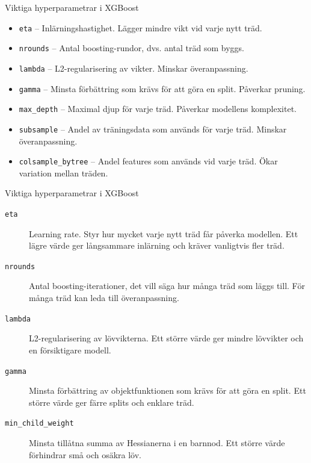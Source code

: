 \documentclass[10pt,english]{beamer}
\begin{document}
\begin{frame}{Viktiga hyperparametrar i XGBoost}
  \begin{itemize}
    \item \texttt{eta} – Inlärningshastighet. Lägger mindre vikt vid varje nytt träd.
    \item \texttt{nrounds} – Antal boosting-rundor, dvs. antal träd som byggs.
    \item \texttt{lambda} – L2-regularisering av vikter. Minskar överanpassning.
    \item \texttt{gamma} – Minsta förbättring som krävs för att göra en split. Påverkar pruning.
    \item \texttt{max\_depth} – Maximal djup för varje träd. Påverkar modellens komplexitet.
    \item \texttt{subsample} – Andel av träningsdata som används för varje träd. Minskar överanpassning.
    \item \texttt{colsample\_bytree} – Andel features som används vid varje träd. Ökar variation mellan träden.
    
    
  \end{itemize}
\end{frame}

\begin{frame}{Viktiga hyperparametrar i XGBoost}

\begin{description}

  \item[\texttt{eta}]
  Learning rate. Styr hur mycket varje nytt träd får påverka modellen.
  Ett lägre värde ger långsammare inlärning och kräver vanligtvis fler träd.

  \item[\texttt{nrounds}]
  Antal boosting-iterationer, det vill säga hur många träd som läggs till.
  För många träd kan leda till överanpassning.

  \item[\texttt{lambda}]
  L2-regularisering av lövvikterna.
  Ett större värde ger mindre lövvikter och en försiktigare modell.

  \item[\texttt{gamma}]
  Minsta förbättring av objektfunktionen som krävs för att göra en split.
  Ett större värde ger färre splits och enklare träd.

  \item[\texttt{min\_child\_weight}]
  Minsta tillåtna summa av Hessianerna i en barnnod.
  Ett större värde förhindrar små och osäkra löv.

\end{description}

\end{frame}
\end{document}
